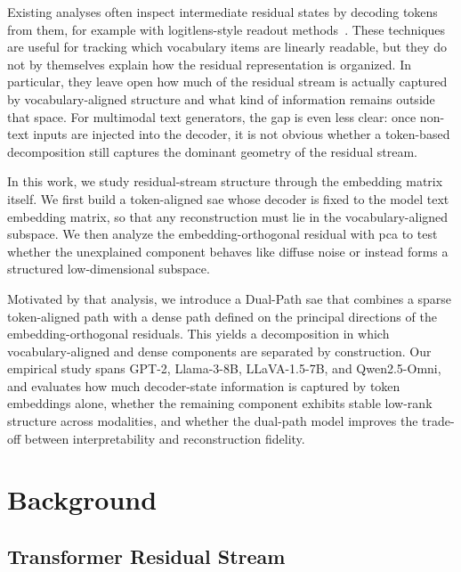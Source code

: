 \documentclass{article}
\begin{document}
Existing analyses often inspect intermediate residual states by decoding tokens from them, for example with \gls{logitlens}-style readout methods~\cite{tenneyBERTRediscoversClassical2019,hewittDesigningInterpretingProbes2019,belroseElicitingLatentPredictions2023}. These techniques are useful for tracking which vocabulary items are linearly readable, but they do not by themselves explain how the residual representation is organized. In particular, they leave open how much of the residual stream is actually captured by vocabulary-aligned structure and what kind of information remains outside that space. For multimodal text generators, the gap is even less clear: once non-text inputs are injected into the decoder, it is not obvious whether a token-based decomposition still captures the dominant geometry of the residual stream.

In this work, we study residual-stream structure through the embedding matrix itself. We first build a token-aligned \gls{sae} whose decoder is fixed to the model text embedding matrix, so that any reconstruction must lie in the vocabulary-aligned subspace. We then analyze the embedding-orthogonal residual with \gls{pca} to test whether the unexplained component behaves like diffuse noise or instead forms a structured low-dimensional subspace.

Motivated by that analysis, we introduce a Dual-Path \gls{sae} that combines a sparse token-aligned path with a dense path defined on the principal directions of the embedding-orthogonal residuals. This yields a decomposition in which vocabulary-aligned and dense components are separated by construction. Our empirical study spans GPT-2, Llama-3-8B, LLaVA-1.5-7B, and Qwen2.5-Omni, and evaluates how much decoder-state information is captured by token embeddings alone, whether the remaining component exhibits stable low-rank structure across modalities, and whether the dual-path model improves the trade-off between interpretability and reconstruction fidelity.

\section{Background}

\subsection{Transformer Residual Stream}
\end{document}

